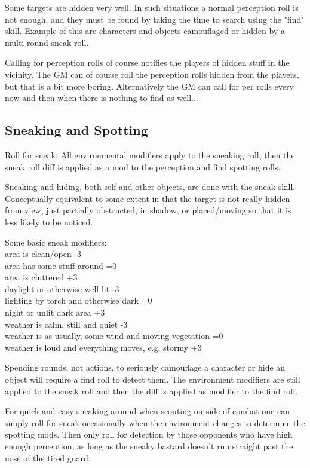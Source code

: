 Some targets are hidden very well. In such situations a normal perception roll is not enough, and they must be found by taking the time to search using the "find" skill. Example of this are characters and objects camouflaged or hidden by a multi-round sneak roll.

Calling for perception rolls of course notifies the players of hidden stuff in the vicinity.
The GM can of course roll the perception rolls hidden from the players, but that is a bit more boring. Alternatively the GM can call for per rolls every now and then when there is nothing to find as well...


\subsection*{Sneaking and Spotting}
Roll for sneak: All environmental modifiers apply to the sneaking roll, then the sneak roll diff is applied as a mod to the perception and find spotting rolls.

Sneaking and hiding, both self and other objects, are done with the sneak skill. Conceptually equivalent to some extent in that the target is not really hidden from view, just partially obstructed, in shadow, or placed/moving so that it is less likely to be noticed.

Some basic sneak modifiers:\\
area is clean/open -3\\
area has some stuff around =0\\
area is cluttered +3\\
daylight or otherwise well lit -3\\
lighting by torch and otherwise dark =0\\
night or unlit dark area +3\\
weather is calm, still and quiet -3\\
weather is as usually, some wind and moving vegetation =0\\
weather is loud and everything moves, e.g. stormy  +3

Spending rounds, not actions, to seriously camouflage a character or hide an object will require a find roll to detect them. The environment modifiers are still applied to the sneak roll and then the diff is applied as modifier to the find roll.

For quick and easy sneaking around when scouting outside of combat one can simply roll for sneak occasionally when the environment changes to determine the spotting mods. Then only roll for detection by those opponents who have high enough perception, as long as the sneaky bastard doesn't run straight past the nose of the tired guard.

